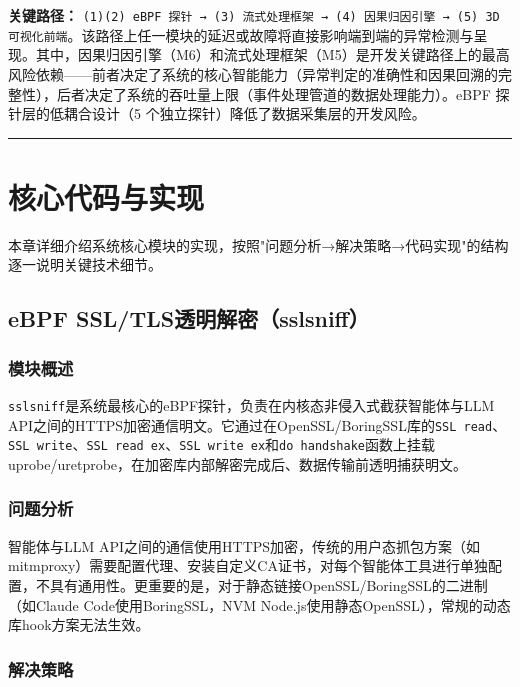\documentclass[a4paper]{ctexart}
\makeatletter
\renewcommand{\_}{%
  \ifmmode
    \nfss@text{\textunderscore}%
  \else
    \textunderscore\discretionary{}{}{}%
  \fi}
\makeatother
\begin{document}
\textbf{关键路径：} \texttt{(1)(2) eBPF 探针 → (3) 流式处理框架 → (4) 因果归因引擎 → (5) 3D 可视化前端}。该路径上任一模块的延迟或故障将直接影响端到端的异常检测与呈现。其中，因果归因引擎（M6）和流式处理框架（M5）是开发关键路径上的最高风险依赖——前者决定了系统的核心智能能力（异常判定的准确性和因果回溯的完整性），后者决定了系统的吞吐量上限（事件处理管道的数据处理能力）。eBPF 探针层的低耦合设计（5 个独立探针）降低了数据采集层的开发风险。


\bigskip
\hrule
\bigskip


\section{核心代码与实现}



本章详细介绍系统核心模块的实现，按照"问题分析→解决策略→代码实现"的结构逐一说明关键技术细节。


\subsection{eBPF SSL/TLS透明解密（sslsniff）}



\subsubsection{模块概述}



\texttt{sslsniff}是系统最核心的eBPF探针，负责在内核态非侵入式截获智能体与LLM API之间的HTTPS加密通信明文。它通过在OpenSSL/BoringSSL库的\texttt{SSL\_read}、\texttt{SSL\_write}、\texttt{SSL\_read\_ex}、\texttt{SSL\_write\_ex}和\texttt{do\_handshake}函数上挂载uprobe/uretprobe，在加密库内部解密完成后、数据传输前透明捕获明文。


\subsubsection{问题分析}



智能体与LLM API之间的通信使用HTTPS加密，传统的用户态抓包方案（如mitmproxy）需要配置代理、安装自定义CA证书，对每个智能体工具进行单独配置，不具有通用性。更重要的是，对于静态链接OpenSSL/BoringSSL的二进制（如Claude Code使用BoringSSL，NVM Node.js使用静态OpenSSL），常规的动态库hook方案无法生效。


\subsubsection{解决策略}
\end{document}
